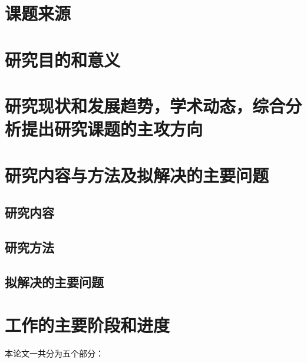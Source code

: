 \documentclass{ctgu-repo}
\title{\vspace*{-25mm}{\hei\bfseries XXXXXXXXX}}
\author{%
    学\hspace*{2em}生：KSKK \\
    指导老师：XWKK~~~~ \\
    三峡大学理学院~~
}
\date{}
\begin{document}
\maketitle

\section{课题来源}

\blindtext

\section{研究目的和意义}

\blindtext

\section{研究现状和发展趋势，学术动态，综合分析提出研究课题的主攻方向}

\blindtext

\section{研究内容与方法及拟解决的主要问题}

\blindtext

\subsection{研究内容}

\blindtext

\subsection{研究方法}

\blindtext

\subsection{拟解决的主要问题}

\blindtext

\section{工作的主要阶段和进度}

本论文一共分为五个部分：
\end{document}
